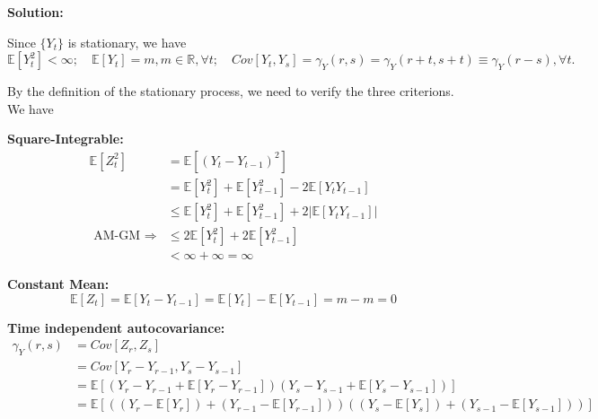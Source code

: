 \documentclass[11pt]{article}
\theoremstyle{plain} %
\newenvironment{solution}
{\color{C2}\normalfont\begin{framed}\begingroup\textbf{Solution:} }
  {\endgroup\end{framed}}
\theoremstyle{remark}
\newcommand{\EE}{\mathbb{E}}
\begin{document}
\begin{solution}
	\begin{enumerate}[label = (\alph*)]{
		\item  Since $\{Y_{t}\}$ is stationary, we have
		      \[
			      \EE [Y_{t}^{2}] < \infty; \quad \EE[Y_{t}] = m, m\in \mathbb{R}, \forall t; \quad Cov[Y_{t}, Y_{s}] = \gamma_{Y}(r,s) = \gamma_{Y}(r+t,s+t) \equiv \gamma_{Y}(r-s),  \forall t.
		      \]

		      By the definition of the stationary process, we need to verify the three criterions. We have
		      \begin{enumerate}[label=(\roman*)]{
			      \item \textbf{Square-Integrable:}
			            \begin{align*}
				            \EE[Z_{t}^{2}] & = \EE[(Y_{t}-Y_{t-1})^{2}]                                 \\
				                           & = \EE[Y_{t}^{2}]+\EE[Y_{t-1}^{2}] - 2\EE[Y_{t}Y_{t-1}]     \\
				                           & \le \EE[Y_{t}^{2}]+\EE[Y_{t-1}^{2}] + 2|\EE[Y_{t}Y_{t-1}]| \\
				            \text{ AM-GM }\Longrightarrow
				                           & \le 2\EE[Y_{t}^{2}]+2\EE[Y_{t-1}^{2}]                      \\
				                           & < \infty + \infty = \infty
			            \end{align*}
			      \item \textbf{Constant Mean:}
			            $$
				            \EE[Z_{t}] = \EE[Y_{t}-Y_{t-1}] = \EE[Y_{t}]-\EE[Y_{t-1}] = m - m = 0
			            $$
			      \item \textbf{Time independent autocovariance:}
			            \begin{align*}
				            \gamma_{Y}(r,s) & = Cov[Z_{r}, Z_{s}]                                                                                                      \\
				                            & = Cov[Y_{r}-Y_{r-1}, Y_{s}-Y_{s-1}]                                                                                      \\
				                            & = \EE[\left(Y_{r}-Y_{r-1} + \EE[Y_{r}-Y_{r-1}]\right)\left(Y_{s}-Y_{s-1} + \EE[Y_{s}-Y_{s-1}]\right)]                    \\
				                            & = \EE[\left((Y_{r}-\EE[Y_{r}]) + (Y_{r-1}-\EE[Y_{r-1}])\right)\left((Y_{s}-\EE[Y_{s}]) + (Y_{s-1}-\EE[Y_{s-1}]) \right)] \\

\end{align*}}
\end{enumerate}}
\end{enumerate}
\end{solution}
\end{document}
